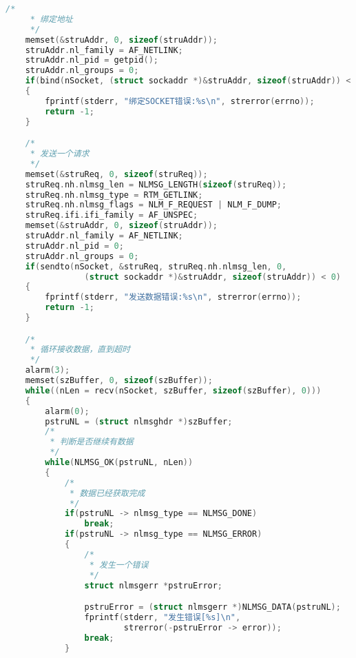 \documentclass[a4paper,11pt,]{article}%
\begin{document}
\begin{appendices}
\begin{lstlisting}[language=C, caption= NetLink 获取网卡信息]
    /*
     * 绑定地址
     */
    memset(&struAddr, 0, sizeof(struAddr));
    struAddr.nl_family = AF_NETLINK;
    struAddr.nl_pid = getpid();
    struAddr.nl_groups = 0;
    if(bind(nSocket, (struct sockaddr *)&struAddr, sizeof(struAddr)) < 0)
    {
        fprintf(stderr, "绑定SOCKET错误:%s\n", strerror(errno));
        return -1;
    }

    /*
     * 发送一个请求
     */
    memset(&struReq, 0, sizeof(struReq));
    struReq.nh.nlmsg_len = NLMSG_LENGTH(sizeof(struReq));
    struReq.nh.nlmsg_type = RTM_GETLINK;
    struReq.nh.nlmsg_flags = NLM_F_REQUEST | NLM_F_DUMP;
    struReq.ifi.ifi_family = AF_UNSPEC;
    memset(&struAddr, 0, sizeof(struAddr));
    struAddr.nl_family = AF_NETLINK;
    struAddr.nl_pid = 0;
    struAddr.nl_groups = 0;
    if(sendto(nSocket, &struReq, struReq.nh.nlmsg_len, 0,
                (struct sockaddr *)&struAddr, sizeof(struAddr)) < 0)
    {
        fprintf(stderr, "发送数据错误:%s\n", strerror(errno));
        return -1;
    }

    /*
     * 循环接收数据，直到超时
     */
    alarm(3);
    memset(szBuffer, 0, sizeof(szBuffer));
    while((nLen = recv(nSocket, szBuffer, sizeof(szBuffer), 0)))
    {
        alarm(0);
        pstruNL = (struct nlmsghdr *)szBuffer;
        /*
         * 判断是否继续有数据
         */
        while(NLMSG_OK(pstruNL, nLen))
        {
            /*
             * 数据已经获取完成
             */
            if(pstruNL -> nlmsg_type == NLMSG_DONE)
                break;
            if(pstruNL -> nlmsg_type == NLMSG_ERROR)
            {
                /*
                 * 发生一个错误
                 */
                struct nlmsgerr *pstruError;

                pstruError = (struct nlmsgerr *)NLMSG_DATA(pstruNL);
                fprintf(stderr, "发生错误[%s]\n",
                        strerror(-pstruError -> error));
                break;
            }


\end{lstlisting}
\end{appendices}
\end{document}
